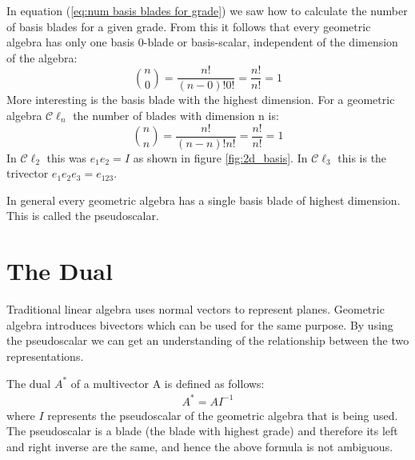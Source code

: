\documentclass[10pt]{report}
\begin{document}
In equation (\ref{eq:num basis blades for grade}) we saw how to
calculate the number of basis blades for a given grade. From this
it follows that every geometric algebra has only one basis
$0$-blade or basis-scalar, independent of the dimension of the
algebra:
\begin{displaymath}
    \binom{n}{0} = \frac{n!}{(n-0)!0!} = \frac{n!}{n!} = 1
\end{displaymath}
More interesting is the basis blade with the highest dimension.
For a geometric algebra $\mathcal{C}\ell_n$ the number of blades
with dimension n is:
\begin{displaymath}
    \binom{n}{n} = \frac{n!}{(n-n)!n!} = \frac{n!}{n!} = 1
\end{displaymath}
In $\mathcal{C}\ell_2$ this was $e_1e_2 = I$ as shown in figure
\ref{fig:2d_basis}. In $\mathcal{C}\ell_3$ this is the trivector
$e_1e_2e_3 = e_{123}$.

In general every geometric algebra has a single basis blade of
highest dimension. This is called the pseudoscalar.

\section{The Dual}

Traditional linear algebra uses normal vectors to represent
planes. Geometric algebra introduces bivectors which can be
used for the same purpose. By using the pseudoscalar we can get an
understanding of the relationship between the two representations.

The dual $A^*$ of a multivector A is defined as follows:
\begin{align}
    \label{eq:dual}
    A^* = AI^{-1}
\end{align}
where $I$ represents the pseudoscalar of the geometric algebra
that is being used. The pseudoscalar is a blade (the blade with
highest grade) and therefore its left and right inverse are the
same, and hence the above formula is not ambiguous.
\end{document}
